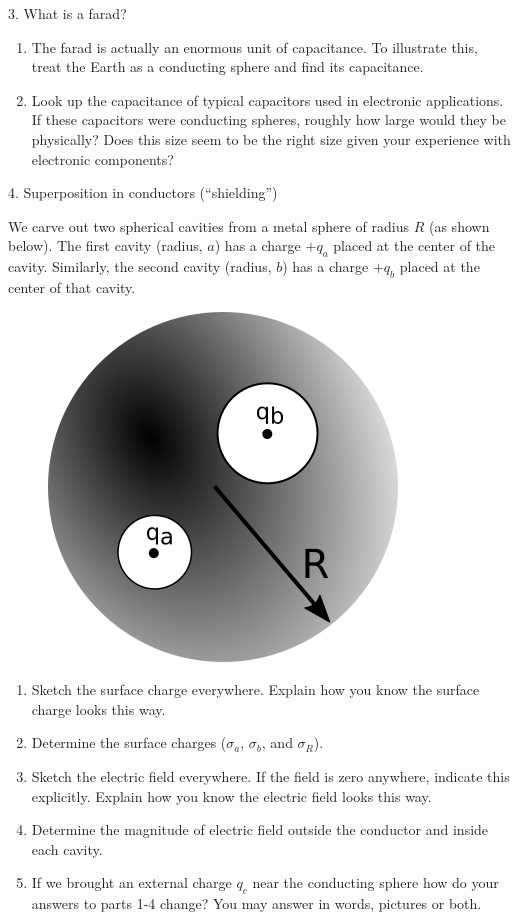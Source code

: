 \documentclass[11pt]{article}
\def\tightlist{}
\begin{document}
{3. What is a farad?}\label{what-is-a-farad}

\begin{enumerate}
\def\labelenumi{\arabic{enumi}.}
\tightlist
\item
  The farad is actually an enormous unit of capacitance. To illustrate
  this, treat the Earth as a conducting sphere and find its capacitance.
\item
  Look up the capacitance of typical capacitors used in electronic
  applications. If these capacitors were conducting spheres, roughly how
  large would they be physically? Does this size seem to be the right
  size given your experience with electronic components?
\end{enumerate}

{\texorpdfstring{4. Superposition in conductors
(``shielding'')}{4. Superposition in conductors (shielding)}}\label{superposition-in-conductors-shielding}

We carve out two spherical cavities from a metal sphere of radius \(R\)
(as shown below). The first cavity (radius, \(a\)) has a charge \(+q_a\)
placed at the center of the cavity. Similarly, the second cavity
(radius, \(b\)) has a charge \(+q_b\) placed at the center of that
cavity.

\begin{figure}[htbp]
\centering
\includegraphics[width=0.5\linewidth]{./images/hw5/shielded_charges.png}
\end{figure}

\begin{enumerate}
\def\labelenumi{\arabic{enumi}.}
\tightlist
\item
  Sketch the surface charge everywhere. Explain how you know the surface
  charge looks this way.
\item
  Determine the surface charges (\(\sigma_a\), \(\sigma_b\), and
  \(\sigma_R\)).
\item
  Sketch the electric field everywhere. If the field is zero anywhere,
  indicate this explicitly. Explain how you know the electric field
  looks this way.
\item
  Determine the magnitude of electric field outside the conductor and
  inside each cavity.
\item
  If we brought an external charge \(q_c\) near the conducting sphere
  how do your answers to parts 1-4 change? You may answer in words,
  pictures or both.
\end{enumerate}
\end{document}
